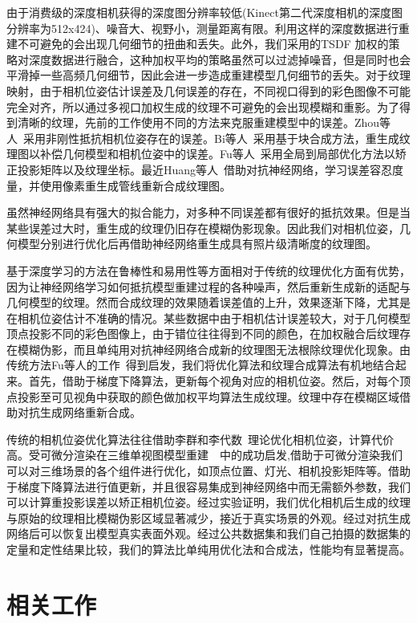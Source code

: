 由于消费级的深度相机获得的深度图分辨率较低(Kinect第二代深度相机的深度图分辨率为512x424)、噪音大、视野小，测量距离有限。利用这样的深度数据进行重建不可避免的会出现几何细节的扭曲和丢失。此外，我们采用的TSDF 加权的策略对深度数据进行融合，这种加权平均的策略虽然可以过滤掉噪音，但是同时也会平滑掉一些高频几何细节，因此会进一步造成重建模型几何细节的丢失。对于纹理映射，由于相机位姿估计误差及几何误差的存在，不同视口得到的彩色图像不可能完全对齐，所以通过多视口加权生成的纹理不可避免的会出现模糊和重影。为了得到清晰的纹理，先前的工作使用不同的方法来克服重建模型中的误差。Zhou等人~\cite{zhou2014color}采用非刚性抵抗相机位姿存在的误差。Bi等人~\cite{bi2017patch}采用基于块合成方法，重生成纹理图以补偿几何模型和相机位姿中的误差。Fu等人~\cite{fu2018texture}采用全局到局部优化方法以矫正投影矩阵以及纹理坐标。最近Huang等人~\cite{JingweiHuang2020AdversarialTO}借助对抗神经网络，学习误差容忍度量，并使用像素重生成管线重新合成纹理图。\par
虽然神经网络具有强大的拟合能力，对多种不同误差都有很好的抵抗效果。但是当某些误差过大时，重生成的纹理仍旧存在模糊伪影现象。因此我们对相机位姿，几何模型分别进行优化后再借助神经网络重生成具有照片级清晰度的纹理图。\par
基于深度学习的方法在鲁棒性和易用性等方面相对于传统的纹理优化方面有优势，因为让神经网络学习如何抵抗模型重建过程的各种噪声，然后重新生成新的适配与几何模型的纹理。然而合成纹理的效果随着误差值的上升，效果逐渐下降，尤其是在相机位姿估计不准确的情况。某些数据中由于相机估计误差较大，对于几何模型顶点投影不同的彩色图像上，由于错位往往得到不同的颜色，在加权融合后纹理存在模糊伪影，而且单纯用对抗神经网络合成新的纹理图无法根除纹理优化现象。由传统方法Fu等人的工作~\cite{fu2018texture}得到启发，我们将优化算法和纹理合成算法有机地结合起来。首先，借助于梯度下降算法，更新每个视角对应的相机位姿。然后，对每个顶点投影至可见视角中获取的颜色做加权平均算法生成纹理。纹理中存在模糊区域借助对抗生成网络重新合成。\par
传统的相机位姿优化算法往往借助李群和李代数~\cite{sola2018micro}理论优化相机位姿，计算代价高。受可微分渲染在三维单视图模型重建~\cite{liu2020general}~\cite{ShichenLiu2019SoftRA}中的成功启发,借助于可微分渲染我们可以对三维场景的各个组件进行优化，如顶点位置、灯光、相机投影矩阵等。借助于梯度下降算法进行值更新，并且很容易集成到神经网络中而无需额外参数，我们可以计算重投影误差以矫正相机位姿。经过实验证明，我们优化相机后生成的纹理与原始的纹理相比模糊伪影区域显著减少，接近于真实场景的外观。经过对抗生成网络后可以恢复出模型真实表面外观。经过公共数据集和我们自己拍摄的数据集的定量和定性结果比较，我们的算法比单纯用优化法和合成法，性能均有显著提高。
\section{相关工作}
